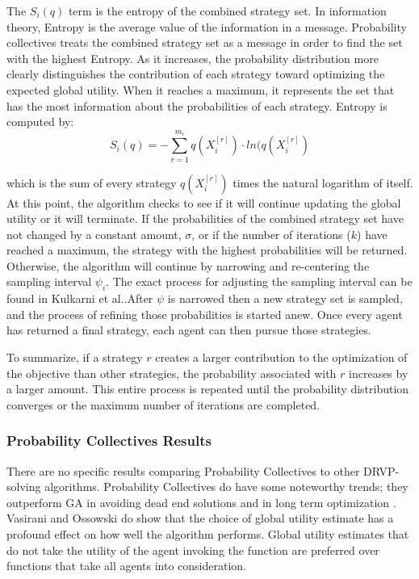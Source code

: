 \documentclass{sig-alternate}
\begin{document}
The $S_i(q)$ term is the entropy of the combined strategy set. In information theory, Entropy is the average value of the information in a message. Probability collectives treats the combined strategy set as a message in order to find the set with the highest Entropy. As it increases, the probability distribution more clearly distinguishes the contribution of each strategy toward optimizing the expected global utility. When it reaches a maximum, it represents the set that has the most information about the probabilities of each strategy. Entropy is computed by:
	\begin{equation}
	S_i(q)=-\sum_{r=1}^{m_i}q(X_i^{[r]})\cdot ln(q(X_i^{[r]})
	\end{equation}
	
which is the sum of every strategy $q(X_i^{[r]})$ times the natural logarithm of itself. At this point, the algorithm checks to see if it will continue updating the global utility or it will terminate. If the probabilities of the combined strategy set have not changed by a constant amount, $\sigma$, or if the number of iterations ($k$) have reached a maximum, the strategy with the highest probabilities will be returned. Otherwise, the algorithm will continue by narrowing and re-centering the sampling interval $\psi_i$. The exact process for adjusting the sampling interval can be found in Kulkarni et al.\cite{book}.After $\psi$ is narrowed then a new strategy set is sampled, and the process of refining those probabilities is started anew. Once every agent has returned a final strategy, each agent can then pursue those strategies.

To summarize, if a strategy $r$ creates a larger contribution to the optimization of the objective than other strategies, the probability associated with $r$ increases by a larger amount. This entire process is repeated until the probability distribution converges or the maximum number of iterations are completed. 

\subsubsection{Probability Collectives Results}
There are no specific results comparing Probability Collectives to other DRVP-solving algorithms. Probability Collectives do have some noteworthy trends; they outperform GA in avoiding dead end solutions and in long term optimization \cite{book}. Vasirani and Ossowski \cite{Vasirani:2008} do show that the choice of global utility estimate has a profound effect on how well the algorithm performs. Global utility estimates that do not take the utility of the agent invoking the function are preferred over functions that take all agents into consideration.
\end{document}
